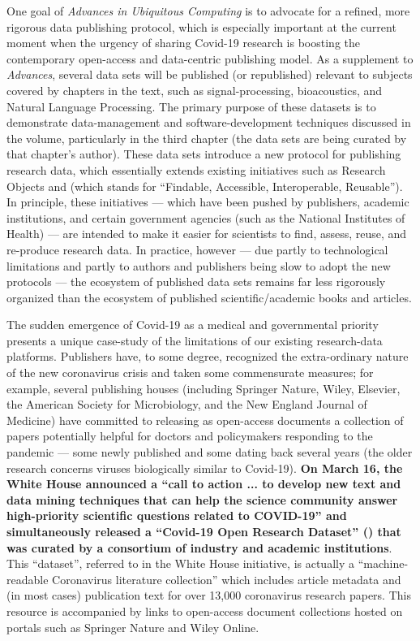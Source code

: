 \documentclass[11pt,letterpaper]{article}
\newcommand{\FAIR}{\resizebox{!}{7pt}{\AcronymText{FAIR}}}
\newcommand{\textscc}[1]{{\color{orr!35!black}{{%
						\fontfamily{Cabin-TLF}\fontseries{b}\selectfont{\textsc{\scriptsize{#1}}}}}}}
\newcommand{\AcronymText}[1]{{\textscc{#1}}}
\newcommand{\Cnineteen}{\resizebox{!}{7pt}{\AcronymText{CORD-19}}}
\newcommand{\p}[1]{

\vspace{.85em}#1}
\newcommand{\q}[1]{{\fontfamily{qcr}\selectfont ``}#1{\fontfamily{qcr}\selectfont ''}}
\begin{document}
{\vspace{2.5em}

\p{One goal of \textit{Advances in Ubiquitous Computing} 
is to advocate for a refined, more rigorous data publishing 
protocol, which is especially important at the 
current moment when the urgency of sharing Covid-19 
research is boosting the contemporary open-access 
and data-centric publishing model.  As a supplement to 
\textit{Advances}, several data sets will be published (or 
republished) relevant to subjects covered by 
chapters in the text, such as signal-processing, 
bioacoustics, and Natural Language Processing.  
The primary purpose of these datasets is to demonstrate 
data-management and software-development techniques 
discussed in the volume, particularly in the 
third chapter (the data sets are being curated by that 
chapter's author).  These data sets introduce a new 
protocol for publishing research data, which essentially 
extends existing initiatives such as Research Objects 
and \FAIR{} (which stands for \q{Findable, Accessible, 
Interoperable, Reusable}).  In principle, these initiatives 
--- which have been pushed by publishers, academic 
institutions, and certain government agencies 
(such as the National Institutes of Health) --- are intended to make 
it easier for scientists to find, assess, 
reuse, and re-produce research data.  
In practice, however --- due partly to  
technological limitations and partly to 
authors and publishers being slow to adopt 
the new protocols --- the ecosystem of 
published data sets remains far less rigorously 
organized than the ecosystem of published 
scientific/academic books and articles.}

\p{The sudden emergence of Covid-19 as a 
medical and governmental priority presents a 
unique case-study of the limitations of our 
existing research-data platforms.  Publishers 
have, to some degree, recognized the extra-ordinary 
nature of the new coronavirus crisis and 
taken some commensurate measures; for example, 
several publishing houses (including Springer Nature, 
Wiley, Elsevier, the American Society for Microbiology, and the New England Journal 
of Medicine) have committed to releasing as 
open-access documents a collection of papers 
potentially helpful for doctors and 
policymakers responding to the pandemic --- 
some newly published and some dating back several 
years (the older research concerns viruses 
biologically similar to Covid-19).  \textbf{On 
March 16, the White House announced a 
\q{call to action ... to develop new text and data mining techniques that can help the science community answer high-priority scientific questions related to COVID-19} and simultaneously released 
a \q{Covid-19 Open Research Dataset} (\Cnineteen{}) that was 
curated by a consortium of industry and academic 
institutions}.  This \q{dataset}, referred to in the 
White House initiative, is actually a 
\q{machine-readable Coronavirus literature collection} 
which includes article metadata and (in most cases) 
publication text  
for over 13,000 coronavirus research papers.  
This resource is accompanied by links to open-access 
document collections hosted on portals such as 
Springer Nature and Wiley Online.}

}
\end{document}
